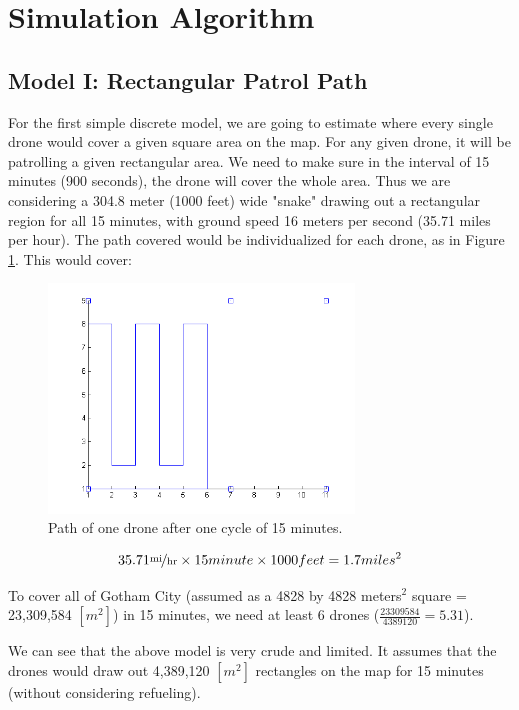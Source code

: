 \documentclass{article}
\begin{document}
\section {Simulation Algorithm}

\subsection{Model I: Rectangular Patrol Path}

For the first simple discrete model, we are going to estimate where every single drone would cover a given square area on the map. For any given drone, it will be patrolling a given rectangular area. We need to make sure in the interval of 15 minutes (900 seconds), the drone will cover the whole area. Thus we are considering a 304.8 meter (1000 feet) wide "snake" drawing out a rectangular region for all 15 minutes, with ground speed 16 meters per second (35.71 miles per hour). The path covered would be individualized for each drone, as in Figure \ref{M1Path1}. This would cover:

\begin{figure}[htb!]
\begin{center}
\includegraphics[width=3.2in]{M1Path1.png}
\end{center}
\caption{Path of one drone after one cycle of 15 minutes.
\label{M1Path1}}
\end{figure}

\begin{equation}
35.71 \unitfrac{mi}{hr} \times 15 minute \times 1000 feet = 1.7 miles^2
\end{equation}

To cover all of Gotham City (assumed as a 4828 by 4828 meters$^{2}$ square = 23,309,584 $[m^{2}]$) in 15 minutes, we need at least 6 drones ($\frac{23309584}{4389120} = 5.31$). 

We can see that the above model is very crude and limited. It assumes that the drones would draw out 4,389,120 $[m^{2}]$ rectangles on the map for 15 minutes (without considering refueling). 
\end{document}
